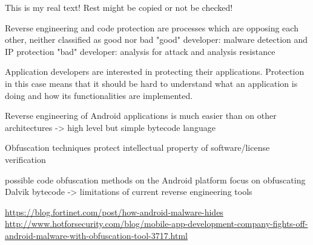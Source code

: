 This is my real text! Rest might be copied or not be checked!

%
Reverse engineering and code protection are processes which are opposing each other, neither classified as good nor bad\newline
"good" developer: malware detection and IP protection\newline
"bad" developer: analysis for attack and analysis resistance

\cite{kovachevaMaster}
%

Application developers are interested in protecting their applications. Protection in this case means that it should be hard to understand
what an application is doing and how its functionalities are implemented.\newline


Reverse engineering of Android applications is much easier than on other architectures -> high level but simple bytecode language\newline

Obfuscation techniques protect intellectual property of software/license verification\newline

possible code obfuscation methods on the Android platform focus on obfuscating Dalvik bytecode -> limitations of current reverse engineering tools\newline



\url{https://blog.fortinet.com/post/how-android-malware-hides}\newline
\url{http://www.hotforsecurity.com/blog/mobile-app-development-company-fights-off-android-malware-with-obfuscation-tool-3717.html}\newline
